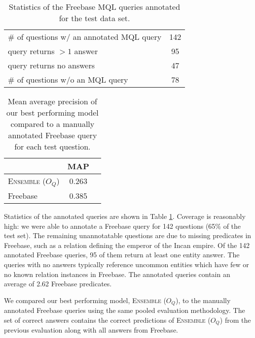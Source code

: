 \documentclass[11pt]{article}
\newcommand{\eqr}{\textsc{Ensemble} (\ensuremath{O_Q})}
\begin{document}
\begin{table}
\centering
{\small
\begin{tabular}{lc}  \toprule
\# of questions w/ an annotated MQL query & 142 \\
\quad{} query returns $>1$ answer & 95 \\
\quad{} query returns no answers & 47 \\  \midrule
\# of questions w/o an MQL query & 78 \\ \bottomrule
\end{tabular}
}
\vspace{-.1in}
\caption{Statistics of the Freebase MQL queries annotated for the test data set.}
\label{table:fbstatistics}
\vspace{-.1in}
\end{table}

\begin{table}
\centering
\vspace{-.04in}
{\small
\begin{tabular}{lcc} \toprule
 & MAP  \\ \midrule
\eqr{} & 0.263  \\
Freebase & 0.385 \\ \bottomrule
\end{tabular}
}
\vspace{-.1in}
\caption{Mean average precision of our best performing model compared
  to a manually annotated Freebase query for each test question.}
\label{table:fbresults}
\vspace{-.1in}
\end{table}

Statistics of the annotated queries are shown in Table
\ref{table:fbstatistics}. Coverage is reasonably high: we were able to
annotate a Freebase query for 142 questions (65\% of the test set). The
remaining unannotatable questions are due to missing predicates in
Freebase, such as a relation defining the emperor of the Incan
empire. Of the 142 annotated Freebase queries, 95 of them return at
least one entity answer. The queries with no answers typically
reference uncommon entities which have few or no known relation
instances in Freebase. The annotated queries contain an average of
2.62 Freebase predicates.

We compared our best performing model, \eqr{}, to the manually
annotated Freebase queries using the same pooled evaluation
methodology. The set of correct answers contains the correct
predictions of \eqr{} from the previous evaluation along with all
answers from Freebase. 
\end{document}
